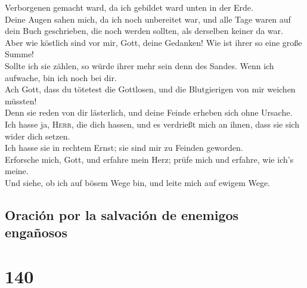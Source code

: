 Verborgenen gemacht ward, da ich gebildet ward unten in der Erde.\\
 Deine Augen sahen mich, da ich noch unbereitet war, und
alle Tage waren auf dein Buch geschrieben, die noch werden sollten, als
derselben keiner da war.\\
 Aber wie köstlich sind vor mir, Gott, deine Gedanken!
Wie ist ihrer so eine große Summe!\\
 Sollte ich sie zählen, so würde ihrer mehr sein denn des
Sandes. Wenn ich aufwache, bin ich noch bei dir.\\
 Ach Gott, dass du tötetest die Gottlosen, und die
Blutgierigen von mir weichen müssten!\\
 Denn sie reden von dir lästerlich, und deine Feinde
erheben sich ohne Ursache.\\
 Ich hasse ja, \textsc{Herr}, die dich hassen, und es
verdrießt mich an ihnen, dass sie sich wider dich setzen.\\
 Ich hasse sie in rechtem Ernst; sie sind mir zu Feinden
geworden.\\
 Erforsche mich, Gott, und erfahre mein Herz; prüfe mich
und erfahre, wie ich's meine.\\
 Und siehe, ob ich auf bösem Wege bin, und leite mich auf
ewigem Wege.

\hypertarget{oraciuxf3n-por-la-salvaciuxf3n-de-enemigos-engauxf1osos}{%
\subsection{Oración por la salvación de enemigos
engañosos}\label{oraciuxf3n-por-la-salvaciuxf3n-de-enemigos-engauxf1osos}}

\hypertarget{section-139}{%
\section{140}\label{section-139}}

